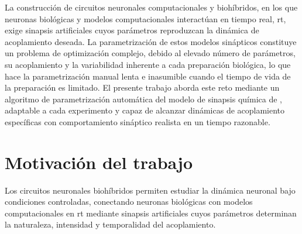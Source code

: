 

La construcción de circuitos neuronales computacionales y biohíbridos, en los que neuronas biológicas y modelos computacionales interactúan en tiempo real, \ac{rt}, exige sinapsis artificiales cuyos parámetros reproduzcan la dinámica de acoplamiento deseada. La parametrización de estos modelos sinápticos constituye un problema de optimización complejo, debido al elevado número de parámetros, su acoplamiento y la variabilidad inherente a cada preparación biológica, lo que hace la parametrización manual lenta e inasumible cuando el tiempo de vida de la preparación es limitado. El presente trabajo aborda este reto mediante un algoritmo de parametrización automática del modelo de sinapsis química de \cite{Golowasch1999}, adaptable a cada experimento y capaz de alcanzar dinámicas de acoplamiento específicas con comportamiento sináptico realista en un tiempo razonable.

\section{Motivación del trabajo\label{SEC:MOTIVACION}}

Los circuitos neuronales biohíbridos permiten estudiar la dinámica neuronal bajo condiciones controladas, conectando neuronas biológicas con modelos computacionales en \ac{rt} mediante sinapsis artificiales cuyos parámetros determinan la naturaleza, intensidad y temporalidad del acoplamiento.

